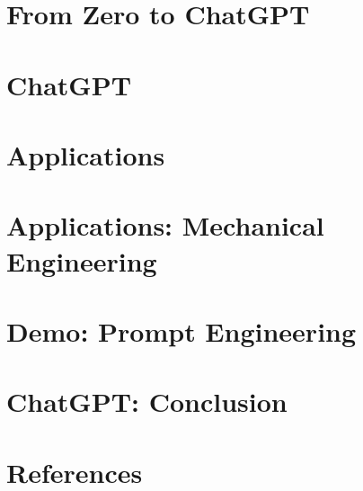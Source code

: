 \section[FromZero]{From Zero to ChatGPT}
% 

\section[ChatGPT]{ChatGPT}
% 

\section[Apps]{Applications}


\section[MechApps]{Applications: Mechanical Engineering}


\section[Demo]{Demo: Prompt Engineering}


\section[ChatGPTConcl]{ChatGPT: Conclusion}


\section[Refs]{References}

